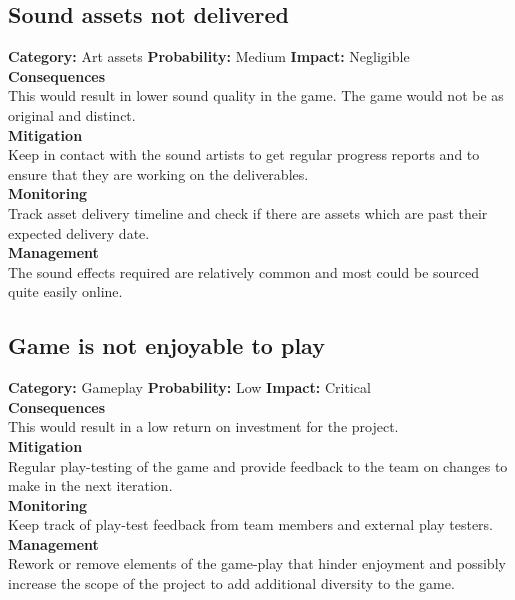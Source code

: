 \documentclass[a4paper,10pt]{article}
\begin{document}
\subsection{Sound assets not delivered}
\textbf{Category:} Art assets\newline
\textbf{Probability:} Medium\newline
\textbf{Impact:} Negligible
\\\textbf{Consequences}\\
This would result in lower sound quality in the game. The game would not be as original and distinct.
\smallskip\\\textbf{Mitigation}\\
Keep in contact with the sound artists to get regular progress reports and to ensure that they are working on the deliverables.
\smallskip\\\textbf{Monitoring}\\
Track asset delivery timeline and check if there are assets which are past their expected delivery date.
\smallskip\\\textbf{Management}\\
The sound effects required are relatively common and most could be sourced quite easily online.

\subsection{Game is not enjoyable to play}
\textbf{Category:} Gameplay\newline
\textbf{Probability:} Low\newline
\textbf{Impact:} Critical
\\\textbf{Consequences}\\
This would result in a low return on investment for the project.
\smallskip\\\textbf{Mitigation}\\
Regular play-testing of the game and provide feedback to the team on changes to make in the next iteration.
\smallskip\\\textbf{Monitoring}\\
Keep track of play-test feedback from team members and external play testers.
\smallskip\\\textbf{Management}\\
Rework or remove elements of the game-play that hinder enjoyment and possibly increase the scope of the project to add additional diversity to the game. 
\end{document}
